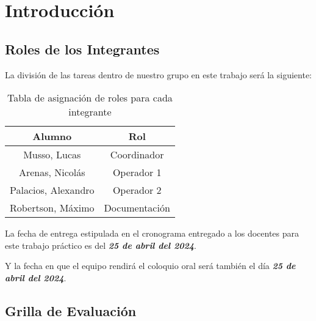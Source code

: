 \section{Introducción}
\subsection{Roles de los Integrantes}

La división de las tareas dentro de nuestro grupo en este trabajo será la siguiente: 

\begin{table}[h!]
    \centering
    \begin{tabular}{|c|c|}
    \hline
        Alumno & Rol \\
    \hline
        Musso, Lucas & Coordinador \\ 
        Arenas, Nicolás & Operador 1 \\
        Palacios, Alexandro & Operador 2 \\
        Robertson, Máximo & Documentación \\
    \hline
        \end{tabular}
        \def\tablename{Tabla} 
        \caption{Tabla de asignación de roles para cada integrante}
        \label{tab:roles}
\end{table}

La fecha de entrega estipulada en el cronograma entregado a los docentes para este trabajo práctico es del \textbf{\textit{25 de abril del 2024}}.

Y la fecha en que el equipo rendirá el coloquio oral será también el día \textbf{\textit{25 de abril del 2024}}.



\subsection{Grilla de Evaluación}

